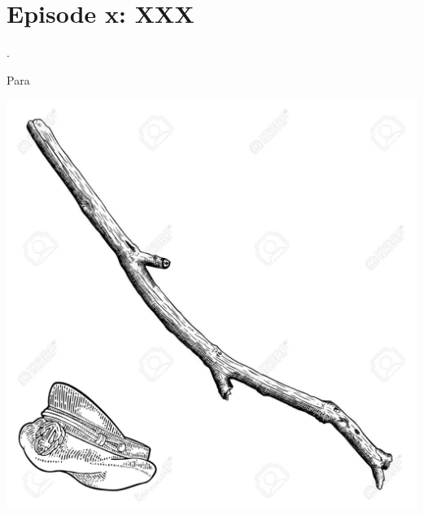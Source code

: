 \section{Episode x: XXX}

\begin{multicols}{2}

.\medskip

Para \medskip




\end{multicols}

\vspace*{5mm}

\begin{center}
\includegraphics[width=\textwidth]{./content/img/xxx.jpg}
\begin{figure}[h]
\end{figure}
\end{center}

\clearpage